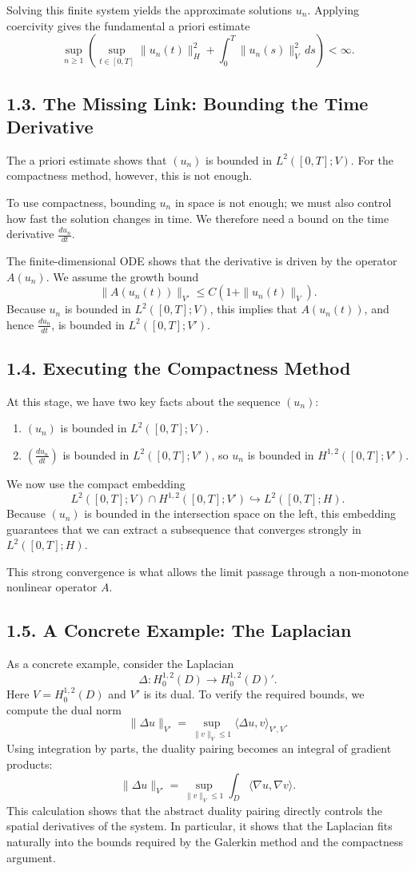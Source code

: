 \documentclass[11pt]{article}
\theoremstyle{definition}
\theoremstyle{remark}
\begin{document}
Solving this finite system yields the approximate solutions \(u_n\). Applying coercivity gives the fundamental a priori estimate
\[
\sup_{n\ge 1}
\left(
\sup_{t\in[0,T]}\|u_n(t)\|_H^2+\int_0^T \|u_n(s)\|_V^2\,ds
\right)
<\infty.
\]

\subsection*{1.3. The Missing Link: Bounding the Time Derivative}
The a priori estimate shows that \((u_n)\) is bounded in \(L^2([0,T];V)\). For the compactness method, however, this is not enough.

To use compactness, bounding \(u_n\) in space is not enough; we must also control how fast the solution changes in time. We therefore need a bound on the time derivative \(\frac{du_n}{dt}\).

The finite-dimensional ODE shows that the derivative is driven by the operator \(A(u_n)\). We assume the growth bound
\[
\|A(u_n(t))\|_{V'}\le C(1+\|u_n(t)\|_V).
\]
Because \(u_n\) is bounded in \(L^2([0,T];V)\), this implies that \(A(u_n(t))\), and hence \(\frac{du_n}{dt}\), is bounded in \(L^2([0,T];V')\).

\subsection*{1.4. Executing the Compactness Method}
At this stage, we have two key facts about the sequence \((u_n)\):
\begin{enumerate}
\item \((u_n)\) is bounded in \(L^2([0,T];V)\).
\item \(\left(\frac{du_n}{dt}\right)\) is bounded in \(L^2([0,T];V')\), so \(u_n\) is bounded in \(H^{1,2}([0,T];V')\).
\end{enumerate}

We now use the compact embedding
\[
L^2([0,T];V)\cap H^{1,2}([0,T];V')\hookrightarrow L^2([0,T];H).
\]
Because \((u_n)\) is bounded in the intersection space on the left, this embedding guarantees that we can extract a subsequence that converges strongly in \(L^2([0,T];H)\).

This strong convergence is what allows the limit passage through a non-monotone nonlinear operator \(A\).

\subsection*{1.5. A Concrete Example: The Laplacian}
As a concrete example, consider the Laplacian
\[
\Delta:H_0^{1,2}(D)\to H_0^{1,2}(D)'.
\]
Here \(V=H_0^{1,2}(D)\) and \(V'\) is its dual. To verify the required bounds, we compute the dual norm
\[
\|\Delta u\|_{V'}
=
\sup_{\|v\|_V\le 1}\langle \Delta u,v\rangle_{V',V}.
\]
Using integration by parts, the duality pairing becomes an integral of gradient products:
\[
\|\Delta u\|_{V'}
=
\sup_{\|v\|_V\le 1}\int_D \langle \nabla u,\nabla v\rangle.
\]
This calculation shows that the abstract duality pairing directly controls the spatial derivatives of the system. In particular, it shows that the Laplacian fits naturally into the bounds required by the Galerkin method and the compactness argument.
\end{document}
